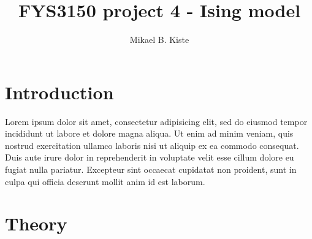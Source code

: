 \documentclass[a4paper, 12pt]{article}
\author{Mikael B. Kiste}
\title{FYS3150 project 4 - Ising model}
\begin{document}
\maketitle
	
	
\tableofcontents \newpage

\section{Introduction}
	Lorem ipsum dolor sit amet, consectetur adipisicing elit, sed do eiusmod
	tempor incididunt ut labore et dolore magna aliqua. Ut enim ad minim veniam,
	quis nostrud exercitation ullamco laboris nisi ut aliquip ex ea commodo
	consequat. Duis aute irure dolor in reprehenderit in voluptate velit esse
	cillum dolore eu fugiat nulla pariatur. Excepteur sint occaecat cupidatat non
	proident, sunt in culpa qui officia deserunt mollit anim id est laborum.

	\newpage

\section{Theory}
\end{document}
